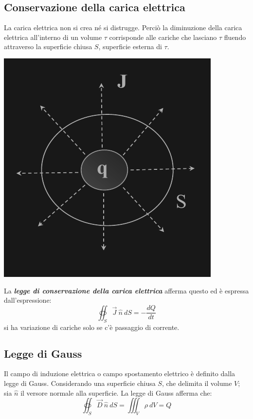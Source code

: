 \documentclass{article}
\begin{document}
\subsection{Conservazione della carica elettrica}
La carica elettrica non si crea né si distrugge. Perciò la diminuzione della carica elettrica
all'interno di un volume $\tau$ corrisponde alle
cariche che lasciano $\tau$ fluendo attraverso la
superficie chiusa $S$, superficie esterna di $\tau$.
\begin{center}
    \includegraphics[scale=0.5]{Image/Conservazione della carica.png}
\end{center}
La \textbf{\textit{
legge di conservazione della carica elettrica}} afferma questo ed è espressa
dall'espressione: 
\[
    \oiint_{S} \vec J \ \hat n \ dS = - \frac{dQ}{dt}
\]
si ha variazione di cariche solo se c'è passaggio di corrente.




\subsection{Legge di Gauss}
Il campo di induzione elettrica o campo spostamento elettrico è definito dalla
legge di Gauss.
Considerando una superficie chiusa $S$,
che delimita il volume $V$; sia $\hat n$ il versore
normale alla superficie. La legge di Gauss
afferma che:
\[
    \oiint_{S} \vec D \ \hat n \ dS = \iiint_{V}\rho \ dV = Q
\]
\end{document}
